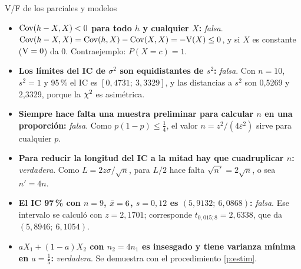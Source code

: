 \begin{modelo}{V/F de los parciales y modelos}
\begin{itemize}
\item \textbf{$\mathrm{Cov}(h-X,X)<0$ para todo $h$ y cualquier $X$:} \emph{falsa}. $\mathrm{Cov}(h-X,X)=\mathrm{Cov}(h,X)-\mathrm{Cov}(X,X)=-\mathrm{V}(X)\le0$, y si $X$ es constante ($\mathrm{V}=0$) da 0. Contraejemplo: $P(X=c)=1$.
\item \textbf{Los límites del IC de $\sigma^2$ son equidistantes de $s^2$:} \emph{falsa}. Con $n=10$, $s^2=1$ y 95\,\% el IC es $[0{,}4731;\ 3{,}3329]$, y las distancias a $s^2$ son 0,5269 y 2,3329, porque la $\chi^2$ es asimétrica.
\item \textbf{Siempre hace falta una muestra preliminar para calcular $n$ en una proporción:} \emph{falsa}. Como $p(1-p)\le\frac14$, el valor $n=z^2/(4\varepsilon^2)$ sirve para cualquier $p$.
\item \textbf{Para reducir la longitud del IC a la mitad hay que cuadruplicar $n$:} \emph{verdadera}. Como $L=2z\sigma/\sqrt n$, para $L/2$ hace falta $\sqrt{n'}=2\sqrt n$, o sea $n'=4n$.
\item \textbf{El IC 97\,\% con $n=9$, $\bar{x}=6$, $s=0{,}12$ es $(5{,}9132;\ 6{,}0868)$:} \emph{falsa}. Ese intervalo se calculó con $z=2{,}1701$; corresponde $t_{0,015;8}=2{,}6338$, que da $(5{,}8946;\ 6{,}1054)$.
\item \textbf{$aX_1+(1-a)X_2$ con $n_2=4n_1$ es insesgado y tiene varianza mínima en $a=\frac15$:} \emph{verdadera}. Se demuestra con el procedimiento \ref{p:estim}.
\end{itemize}
\end{modelo}

